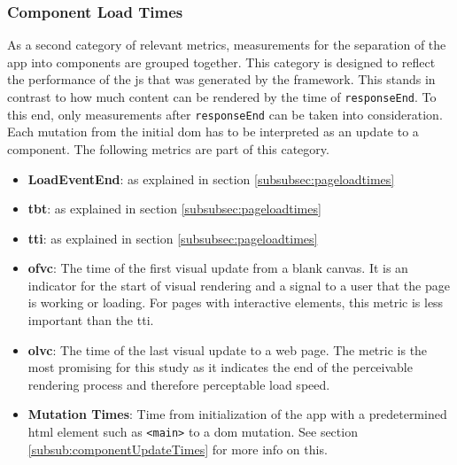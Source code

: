 \documentclass[a4paper, 12pt]{article}
\begin{document}
\subsubsection{Component Load Times}\label{subsubsec:componentloadtimes}
% 

As a second category of relevant metrics, measurements for the separation of the app into components are grouped together.
This category is designed to reflect the performance of the \acrlong{js} that was generated by the framework.
This stands in contrast to how much content can be rendered by the time of \verb|responseEnd|.
To this end, only measurements after \verb|responseEnd| can be taken into consideration.
Each mutation from the initial \acrshort{dom} has to be interpreted as an update to a component.
The following metrics are part of this category.

\begin{itemize}
  \item \textbf{LoadEventEnd}: as explained in section \ref{subsubsec:pageloadtimes}
  \item \textbf{\acrfull{tbt}}: as explained in section \ref{subsubsec:pageloadtimes}
  \item \textbf{\acrfull{tti}}: as explained in section \ref{subsubsec:pageloadtimes}
  \item \textbf{\acrfull{ofvc}}: The time of the first visual update from a blank canvas.
  It is an indicator for the start of visual rendering and a signal to a user that the page is working or loading.
  For pages with interactive elements, this metric is less important than the \acrshort{tti}.
  \item \textbf{\acrfull{olvc}}: The time of the last visual update to a web page.
  The metric is the most promising for this study as it indicates the end of the perceivable rendering process and therefore perceptable load speed.
  \item \textbf{Mutation Times}: Time from initialization of the app with a predetermined \acrshort{html} element such as \verb|<main>| to a \acrshort{dom} mutation.
  See section \ref{subsub:componentUpdateTimes} for more info on this.
\end{itemize}
\end{document}

